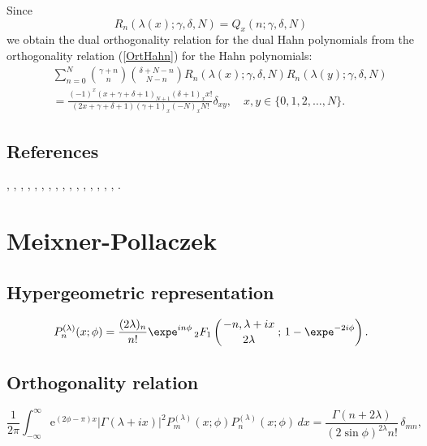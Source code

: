 \documentclass[envcountchap,graybox]{svmono}
\newcounter{rom}
\newcommand{\hyp}[5]{\mbox{}_{#1}{F}_{#2}
\left(\genfrac{}{}{0pt}{}{#3}{#4}\,;\,#5\right)}
\newcommand{\e}{\textrm{e}}
\renewcommand{\Gamma}{\varGamma}
\begin{document}
\noindent
Since
$$R_n(\lambda(x);\gamma,\delta,N)=Q_x(n;\gamma,\delta,N)$$
we obtain the dual orthogonality relation for the dual Hahn polynomials
from the orthogonality relation (\ref{OrtHahn}) for the Hahn polynomials:
\begin{eqnarray*}
& &\sum_{n=0}^N\binom{\gamma+n}{n}\binom{\delta+N-n}{N-n} R_n(\lambda(x);\gamma,\delta,N)R_n(\lambda(y);\gamma,\delta,N)\\
& &{}=\frac{(-1)^x(x+\gamma+\delta+1)_{N+1}(\delta+1)_xx!}
{(2x+\gamma+\delta+1)(\gamma+1)_x(-N)_xN!}\delta_{xy},\quad x,y \in \{0,1,2,\ldots,N\}.
\end{eqnarray*}

\subsection*{References}
\cite{Askey2005}, \cite{AskeyWilson85}, \cite{AtakRahmanSuslov}, \cite{AtakSuslov88},
\cite{Ismail2005II}, \cite{Karlin61}, \cite{Koorn81}, \cite{Koorn88}, \cite{Lesky93},
\cite{Lesky94I}, \cite{Lesky95I}, \cite{Lesky95II}, \cite{Nikiforov+}, \cite{NikiforovUvarov},
\cite{Rahman81II}, \cite{Stanton84}, \cite{Wilson80}.


\section{Meixner-Pollaczek}

\par\setcounter{equation}{0}

\subsection*{Hypergeometric representation}
\begin{equation}
\label{DefMP}
P_n^{(\lambda)}(x;\phi)=\frac{(2\lambda)_n}{n!}\expe^{in\phi}\,
\hyp{2}{1}{-n,\lambda+ix}{2\lambda}{1-\expe^{-2i\phi}}.
\end{equation}

\subsection*{Orthogonality relation}
\begin{equation}
\label{OrtMP}
\frac{1}{2\pi}\int_{-\infty}^{\infty}
\e^{(2\phi-\pi)x}\left|\Gamma(\lambda+ix)\right|^2
P_m^{(\lambda)}(x;\phi)P_n^{(\lambda)}(x;\phi)\,dx
{}=\frac{\Gamma(n+2\lambda)}{(2\sin\phi)^{2\lambda}n!}\,\delta_{mn},
\end{equation}
\end{document}
